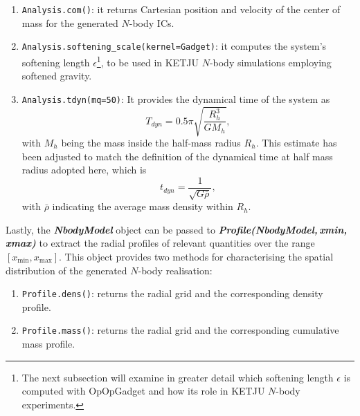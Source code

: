 \documentclass[12pt,twoside,openany]{book}
\begin{document}
 \begin{enumerate}
 \item  \texttt{Analysis.com()}: it returns Cartesian position and velocity of the center of mass for the generated $N$-body ICs.
 \item \texttt{Analysis.softening\_scale(kernel=Gadget)}: it computes the system's softening length $\epsilon$\footnote{The next subsection will examine in greater detail which softening length $\epsilon$ is computed with OpOpGadget and how its role in KETJU $N$-body experiments.}, to be used in KETJU $N$-body simulations employing softened gravity.
  \item \texttt{Analysis.tdyn(mq=50)}: It provides the dynamical time of the system as
\begin{equation}
 T_{dyn}=0.5\pi\sqrt{\frac{R_h^3}{G M_h}},
\end{equation}
with $M_h$ being the mass inside the half-mass radius $R_h$. This estimate has been adjusted to match the definition of the dynamical time at half mass radius adopted here, which is
\begin{equation}\label{dynamical time def}
t_{dyn}=\frac{1}{\sqrt{G\bar{\rho}}},
\end{equation}
with $\bar{\rho}$ indicating the average mass density within $R_h$.
\end{enumerate}
Lastly, the \textbf{\emph{NbodyModel}} object can be passed to \textbf{\emph{Profile(NbodyModel,\,xmin,\,xmax)}} to extract the radial profiles of relevant quantities over the range $[x_{\min},x_{\max}]$. This object provides two methods for characterising the spatial distribution of the generated $N$-body realisation:
\begin{enumerate}
\item \texttt{Profile.dens()}: returns the radial grid and the corresponding density profile.
\item \texttt{Profile.mass()}: returns the radial grid and the corresponding cumulative mass profile.
\end{enumerate}
\end{document}
